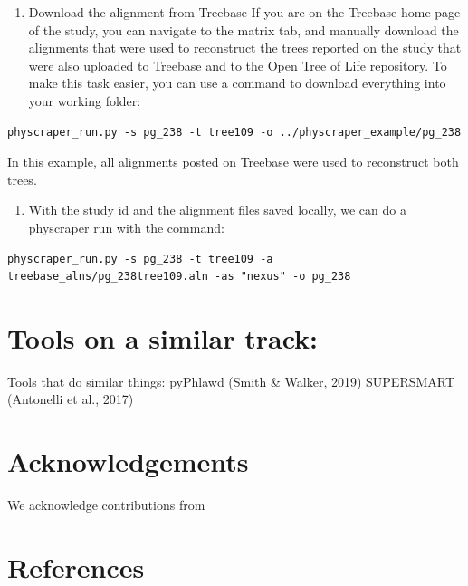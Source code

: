 \documentclass[10pt,a4paper,onecolumn]{article}
\providecommand{\tightlist}{%
  \setlength{\itemsep}{0pt}\setlength{\parskip}{0pt}}
\begin{document}
\begin{enumerate}
\def\labelenumi{\arabic{enumi}.}
\tightlist
\item
  Download the alignment from Treebase If you are on the Treebase home
  page of the study, you can navigate to the matrix tab, and manually
  download the alignments that were used to reconstruct the trees
  reported on the study that were also uploaded to Treebase and to the
  Open Tree of Life repository. To make this task easier, you can use a
  command to download everything into your working folder:
\end{enumerate}

\begin{verbatim}
physcraper_run.py -s pg_238 -t tree109 -o ../physcraper_example/pg_238
\end{verbatim}

In this example, all alignments posted on Treebase were used to
reconstruct both trees.

\begin{enumerate}
\def\labelenumi{\arabic{enumi}.}
\tightlist
\item
  With the study id and the alignment files saved locally, we can do a
  physcraper run with the command:
\end{enumerate}

\begin{verbatim}
physcraper_run.py -s pg_238 -t tree109 -a treebase_alns/pg_238tree109.aln -as "nexus" -o pg_238
\end{verbatim}

\hypertarget{tools-on-a-similar-track}{%
\section{Tools on a similar track:}\label{tools-on-a-similar-track}}

Tools that do similar things: pyPhlawd (Smith \& Walker, 2019)
SUPERSMART (Antonelli et al., 2017)

\hypertarget{acknowledgements}{%
\section{Acknowledgements}\label{acknowledgements}}

We acknowledge contributions from

\hypertarget{references}{%
\section*{References}\label{references}}
\end{document}
